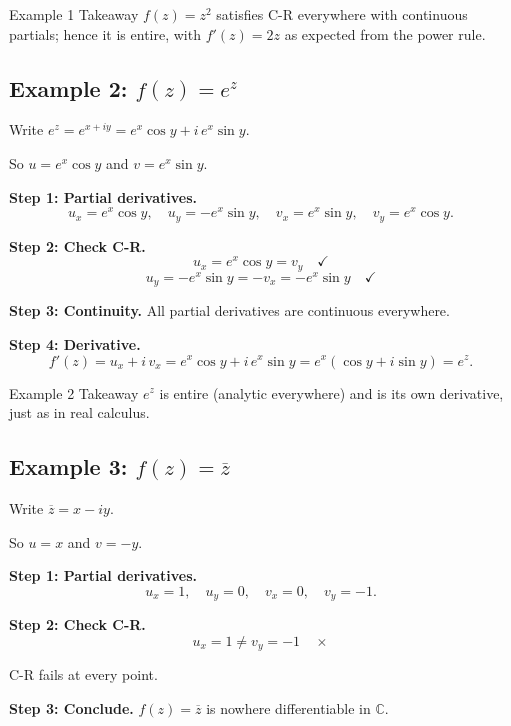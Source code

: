 \documentclass[12pt,a4paper]{article}
\begin{document}
\begin{learnbox}{Example 1 Takeaway}
$f(z) = z^2$ satisfies C-R everywhere with continuous partials; hence it is entire, with $f'(z) = 2z$ as expected from the power rule.
\end{learnbox}

\subsection*{Example 2: $f(z) = e^z$}

Write $e^z = e^{x+iy} = e^x\cos y + i\,e^x\sin y$.

So $u = e^x\cos y$ and $v = e^x\sin y$.

\textbf{Step 1: Partial derivatives.}
\[
  u_x = e^x\cos y, \quad u_y = -e^x\sin y, \quad v_x = e^x\sin y, \quad v_y = e^x\cos y.
\]

\textbf{Step 2: Check C-R.}
\[
  u_x = e^x\cos y = v_y \quad \checkmark
\]
\[
  u_y = -e^x\sin y = -v_x = -e^x\sin y \quad \checkmark
\]

\textbf{Step 3: Continuity.}
All partial derivatives are continuous everywhere.

\textbf{Step 4: Derivative.}
\[
  f'(z) = u_x + i\,v_x = e^x\cos y + i\,e^x\sin y = e^x(\cos y + i\sin y) = e^z.
\]

\begin{learnbox}{Example 2 Takeaway}
$e^z$ is entire (analytic everywhere) and is its own derivative, just as in real calculus.
\end{learnbox}

\subsection*{Example 3: $f(z) = \overline{z}$}

Write $\overline{z} = x - iy$.

So $u = x$ and $v = -y$.

\textbf{Step 1: Partial derivatives.}
\[
  u_x = 1, \quad u_y = 0, \quad v_x = 0, \quad v_y = -1.
\]

\textbf{Step 2: Check C-R.}
\[
  u_x = 1 \neq v_y = -1 \quad \times
\]

C-R fails at every point.

\textbf{Step 3: Conclude.}
$f(z) = \overline{z}$ is nowhere differentiable in $\mathbb{C}$.
\end{document}

